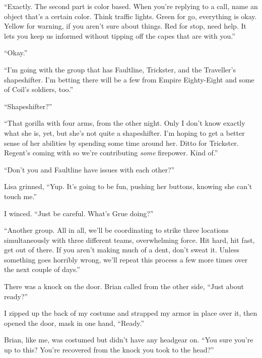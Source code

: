 ``Exactly.  The second part is color based.  When you're replying to a call, name an object that's a certain color.  Think traffic lights.  Green for go, everything is okay.  Yellow for warning, if you aren't sure about things.  Red for stop, need help.  It lets you keep us informed without tipping off the capes that are with you.''



``Okay.''



``I'm going with the group that has Faultline, Trickster, and the Traveller's shapeshifter.  I'm betting there will be a few from Empire Eighty-Eight and some of Coil's soldiers, too.''



``Shapeshifter?''



``That gorilla with four arms, from the other night.  Only I don't know exactly what she is, yet, but she's not quite a shapeshifter.  I'm hoping to get a better sense of her abilities by spending some time around her.  Ditto for Trickster.  Regent's coming with so we're contributing \emph{some} firepower.  Kind of.''



``Don't you and Faultline have issues with each other?''



Lisa grinned, ``Yup.  It's going to be fun, pushing her buttons, knowing she can't touch me.''



I winced.  ``Just be careful.  What's Grue doing?''



``Another group.  All in all, we'll be coordinating to strike three locations simultaneously with three different teams, overwhelming force.  Hit hard, hit fast, get out of there.  If you aren't making much of a dent, don't sweat it.  Unless something goes horribly wrong, we'll repeat this process a few more times over the next couple of days.''



There was a knock on the door.  Brian called from the other side, ``Just about ready?''



I zipped up the back of my costume and strapped my armor in place over it, then opened the door, mask in one hand, ``Ready.''



Brian, like me, was costumed but didn't have any headgear on.  ``You sure you're up to this?  You're recovered from the knock you took to the head?''



